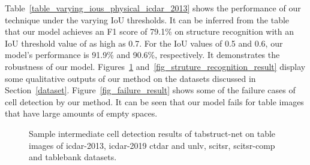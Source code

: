 \documentclass[runningheads]{llncs}
\begin{document}
Table~\ref{table_varying_ious_physical_icdar_2013} shows the performance of our technique under the varying IoU thresholds. It can be inferred from the table that our model achieves an F1 score of 79.1\% on structure recognition with an IoU threshold value of as high as 0.7. For the IoU values of 0.5 and 0.6, our model's performance is 91.9\% and 90.6\%, respectively. It demonstrates the robustness of our model. Figures~\ref{fig_cell_detection_result} and~\ref{fig_struture_recognition_result} display some qualitative outputs of our method on the datasets discussed in Section~\ref{dataset}. Figure~\ref{fig_failure_result} shows some of the failure cases of cell detection by our method. It can be seen that our model fails for table images that have large amounts of empty spaces. 

\begin{figure}[ht!]
\begin{center}
\hspace{-0.01\textwidth}
\hspace{-0.01\textwidth}
\vspace{0.001\textwidth}
\hspace{-0.01\textwidth}
\hspace{-0.01\textwidth}
\end{center}
\caption{Sample intermediate cell detection results of {\sc t}ab{\sc s}truct-{\sc n}et on table images of {\sc icdar-2013}, {\sc icdar-2019} c{\sc td}a{\sc r} and {\sc unlv}, {\sc s}ci{\sc tsr}, {\sc s}ci{\sc tsr-comp} and {\sc t}able{\sc b}ank datasets.}
\label{fig_cell_detection_result}
\end{figure}
\end{document}
